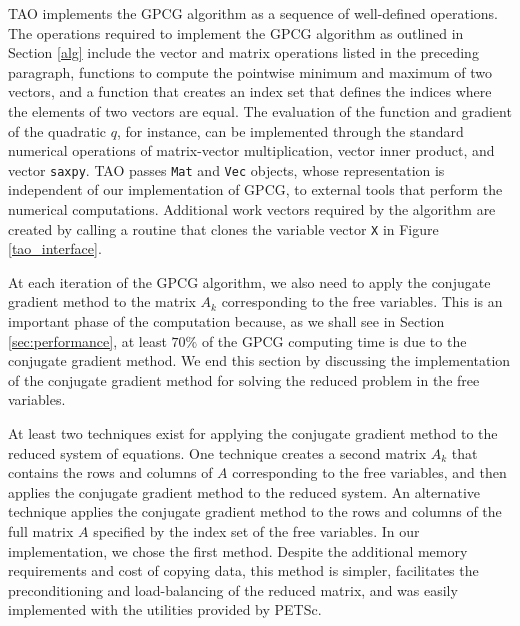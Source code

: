 TAO implements the GPCG algorithm as a sequence of well-defined operations.
The operations required to implement the GPCG algorithm as outlined
in Section \ref{alg} include
the vector and matrix operations listed in the preceding paragraph,
functions to compute
the pointwise minimum and maximum of two vectors,
and a function that creates an
index set that defines the indices where the elements
of two vectors are equal.
The evaluation of the function and gradient of
the quadratic $q$,
for instance, can be implemented through the standard
numerical operations of matrix-vector 
multiplication, vector inner product, and vector \texttt{saxpy}.
TAO passes \texttt{Mat} and \texttt{Vec} objects, whose
representation is independent of our implementation of GPCG, to 
external tools
that perform the numerical computations.
Additional work vectors required by the algorithm 
are created by calling a routine that
clones the variable vector \texttt{X} in Figure \ref{tao_interface}.





At each iteration of the GPCG algorithm, we also need to apply
the conjugate gradient method to the matrix $ A_k $ corresponding
to the free variables.
This is an important phase of the computation because,
as we shall see in Section \ref{sec:performance}, at least $70\%$ of
the GPCG computing time is due to the conjugate gradient method.
We end this section by discussing the implementation of
the conjugate gradient method for solving the
reduced problem in the free variables.

At least two techniques exist for applying the conjugate gradient
method to the reduced system of equations.
One technique creates a second matrix $A_k$ that contains the
rows and columns of $A$ corresponding to the free variables,
and then applies the conjugate gradient method to the reduced system.
An alternative technique applies the conjugate gradient method
to the rows and columns of the full matrix $A$ specified by the
index set of the free variables.
In our implementation, we chose the first method.  Despite the
additional memory requirements and cost of copying data,
this method is simpler,
facilitates the preconditioning and load-balancing of the reduced matrix,
and was easily implemented with the utilities provided by PETSc.

